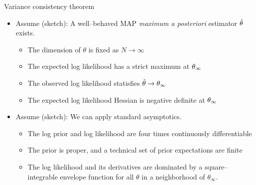 \begin{frame}[t]{Variance consistency theorem}
\pause
%
\begin{itemize}
    \item Assume (sketch): A well--behaved MAP \textit{maximum a posteriori} estimator $\hat\theta$ exists.
    \begin{itemize}
        \item The dimension of $\theta$ is fixed as $N \rightarrow \infty$
        \item The expected log likelihood has a strict maximum at $\theta_{\infty}$
        \item The observed log likelihood statisfies $\hat\theta \rightarrow \theta_{\infty}$
        \item The expected log likelihood Hessian is negative definite at $\theta_{\infty}$ 
    \end{itemize}
    \item Assume (sketch): We can apply standard asymptotics.
    \begin{itemize}
    \item The log prior and log likelihood are four times continuously differentiable
    \item The prior is proper, and a technical set of prior expectations are finite
    \item The log likelihood and its derivatives are dominated by a square--integrable envelope function 
          for all $\theta$ in a neighborhood of $\theta_\infty$.
    \end{itemize}
\end{itemize}
%
\pause



\end{frame}








